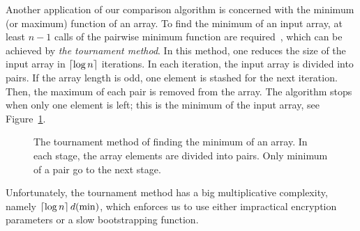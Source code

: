 	Another application of our comparison algorithm is concerned with the minimum (or maximum) function of an array.
	To find the minimum of an input array, at least $n-1$ calls of the pairwise minimum function are required~\cite[Chapter 9]{CLR09}, which can be achieved by \emph{the tournament method}.
	In this method, one reduces the size of the input array in $\left\lceil \log n \right\rceil$ iterations.
	In each iteration, the input array is divided into pairs. 
	If the array length is odd, one element is stashed for the next iteration. 
	Then, the maximum of each pair is removed from the array.
	The algorithm stops when only one element is left; this is the minimum of the input array, see Figure~\ref{fig:minimum_tournament}. 
	\begin{figure}
		\centering
		\caption{The tournament method of finding the minimum of an array. In each stage, the array elements are divided into pairs. Only minimum of a pair go to the next stage.}
		\label{fig:minimum_tournament}
	\end{figure}
	Unfortunately, the tournament method has a big multiplicative complexity, namely $\left\lceil \log n \right\rceil d(\min)$, which enforces us to use either impractical encryption parameters or a slow bootstrapping function.


